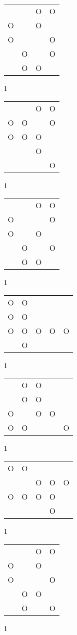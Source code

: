 \begin{tabular}{|m{0.2cm}m{0.2cm}m{0.2cm}m{0.2cm}|}\hline
 & &O&O\\
O& &O& \\
O& & &O\\
 &O& &O\\
 &O&O& \\
\hline\end{tabular}1
\begin{tabular}{|m{0.2cm}m{0.2cm}m{0.2cm}m{0.2cm}|}\hline
 & &O&O\\
O&O& &O\\
O&O&O& \\
 & &O& \\
 & & &O\\
\hline\end{tabular}1
\begin{tabular}{|m{0.2cm}m{0.2cm}m{0.2cm}m{0.2cm}|}\hline
 & &O&O\\
O& & &O\\
O& &O& \\
 &O& &O\\
 &O&O& \\
\hline\end{tabular}1
\begin{tabular}{|m{0.2cm}m{0.2cm}m{0.2cm}m{0.2cm}m{0.2cm}|}\hline
O&O& & & \\
O&O& & & \\
O&O&O&O&O\\
 &O& & & \\
\hline\end{tabular}1
\begin{tabular}{|m{0.2cm}m{0.2cm}m{0.2cm}m{0.2cm}m{0.2cm}|}\hline
 &O&O& & \\
 &O&O& & \\
O& &O&O& \\
O&O& & &O\\
\hline\end{tabular}1
\begin{tabular}{|m{0.2cm}m{0.2cm}m{0.2cm}m{0.2cm}m{0.2cm}|}\hline
O&O& & & \\
 & &O&O&O\\
O&O&O&O& \\
 & & &O& \\
\hline\end{tabular}1
\begin{tabular}{|m{0.2cm}m{0.2cm}m{0.2cm}m{0.2cm}|}\hline
 & &O&O\\
O& &O& \\
O& & &O\\
 &O&O& \\
 &O& &O\\
\hline\end{tabular}1
